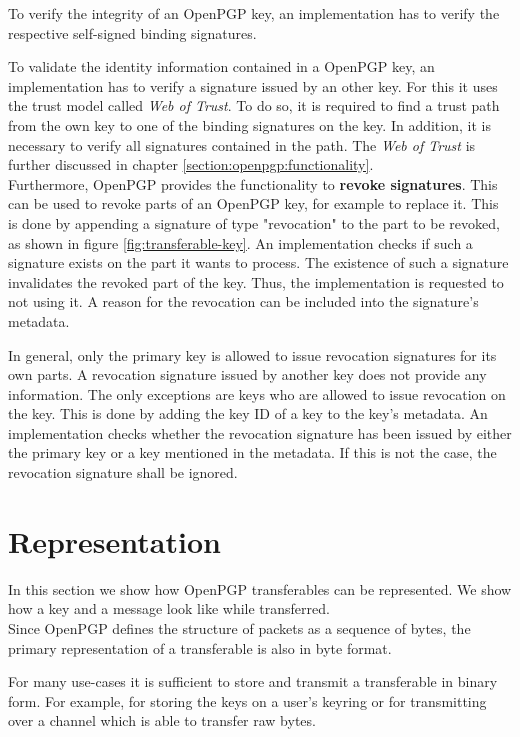 To verify the integrity of an OpenPGP key, an implementation has to verify the respective self-signed binding signatures. 

To validate the identity information contained in a OpenPGP key, an implementation has to verify a signature issued by an other key. For this it uses the trust model called \textit{Web of Trust}. To do so, it is required to find a trust path from the own key to one of the binding signatures on the key. In addition, it is necessary to verify all signatures contained in the path. The \textit{Web of Trust} is further discussed in chapter \ref{section:openpgp:functionality}. \\

Furthermore, OpenPGP provides the functionality to \textbf{revoke signatures}. This can be used to revoke parts of an OpenPGP key, for example to replace it. This is done by appending a signature of type "revocation" to the part to be revoked, as shown in figure \ref{fig:transferable-key}. An implementation checks if such a signature exists on the part it wants to process. The existence of such a signature invalidates the revoked part of the key. Thus, the implementation is requested to not using it. A reason for the revocation can be included into the signature's metadata. 

In general, only the primary key is allowed to issue revocation signatures for its own parts. A revocation signature issued by another key does not provide any information. The only exceptions are keys who are allowed to issue revocation on the key. This is done by adding the key ID of a key to the key's metadata. An implementation checks whether the revocation signature has been issued by either the primary key or a key mentioned in the metadata. If this is not the case, the revocation signature shall be ignored.

\section{Representation}
\label{section:messageformat:asciia}

In this section we show how OpenPGP transferables can be represented. We show how a key and a message look like while transferred. \\

Since OpenPGP defines the structure of packets as a sequence of bytes, the primary representation of a transferable is also in byte format.

For many use-cases it is sufficient to store and transmit a transferable in binary form. For example, for storing the keys on a user's keyring or for transmitting over a channel which is able to transfer raw bytes. \\


